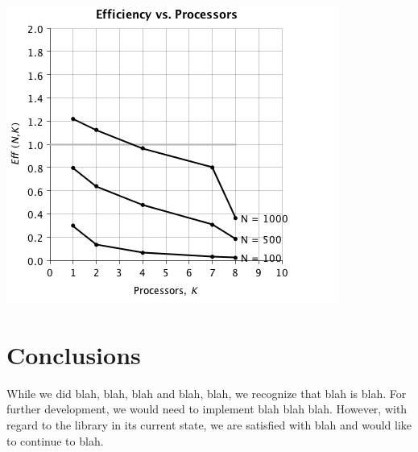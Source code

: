 \documentclass{dependencies/acm_proc_article-sp}
\begin{document}
\begin{center}
\includegraphics[scale=0.5]{images/matrix-inversion/eff-vs-proc.png}
\end{center}

\section{Conclusions}

While we did blah, blah, blah and blah, blah, we recognize that blah is blah. For further development, we would need to implement blah blah blah. However, with regard to the library in its current state, we are satisfied with blah and would like to continue to blah.

\newpage

\newpage
%

%
%
\balancecolumns
\end{document}
